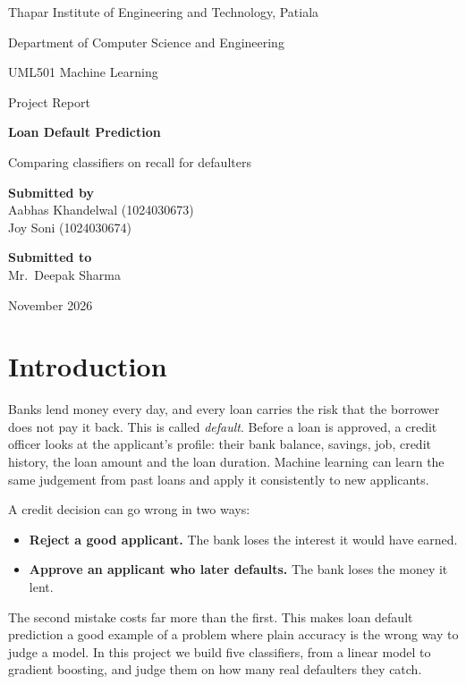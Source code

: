 \documentclass[11pt,a4paper]{article}
\begin{document}
\begin{titlepage}
\centering
\vspace*{3cm}
{\large Thapar Institute of Engineering and Technology, Patiala\par}
\vspace{0.4cm}
{Department of Computer Science and Engineering\par}
\vspace{3cm}
{UML501 Machine Learning\par}
\vspace{0.4cm}
{Project Report\par}
\vspace{1.5cm}
{\LARGE\bfseries Loan Default Prediction\par}
\vspace{0.5cm}
{Comparing classifiers on recall for defaulters\par}
\vspace{3.5cm}
\begin{minipage}[t]{0.48\textwidth}
\raggedright
\textbf{Submitted by}\\[0.4em]
Aabhas Khandelwal (1024030673)\\
Joy Soni (1024030674)
\end{minipage}\hfill
\begin{minipage}[t]{0.48\textwidth}
\raggedleft
\textbf{Submitted to}\\[0.4em]
Mr.\ Deepak Sharma
\end{minipage}
\vfill
{November 2026\par}
\end{titlepage}

\tableofcontents
\thispagestyle{empty}
\newpage
\setcounter{page}{1}

\section{Introduction}

Banks lend money every day, and every loan carries the risk that the borrower does not pay it back. This is called \emph{default}. Before a loan is approved, a credit officer looks at the applicant's profile: their bank balance, savings, job, credit history, the loan amount and the loan duration. Machine learning can learn the same judgement from past loans and apply it consistently to new applicants.

A credit decision can go wrong in two ways:
\begin{itemize}
  \item \textbf{Reject a good applicant.} The bank loses the interest it would have earned.
  \item \textbf{Approve an applicant who later defaults.} The bank loses the money it lent.
\end{itemize}
The second mistake costs far more than the first. This makes loan default prediction a good example of a problem where plain accuracy is the wrong way to judge a model. In this project we build five classifiers, from a linear model to gradient boosting, and judge them on how many real defaulters they catch.
\end{document}
